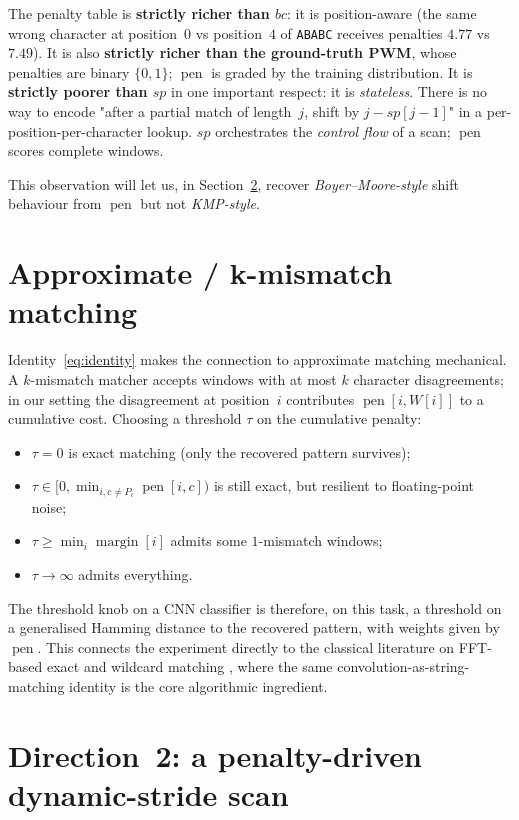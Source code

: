 \documentclass[11pt,a4paper]{article}
\newcommand{\pen}{\operatorname{pen}}
\begin{document}
The penalty table is \textbf{strictly richer than $bc$}: it is
position-aware (the same wrong character at position~$0$ vs position~$4$
of \texttt{ABABC} receives penalties $4.77$ vs $7.49$). It is also
\textbf{strictly richer than the ground-truth PWM}, whose penalties are
binary $\{0,1\}$; $\pen$ is graded by the training distribution.
It is \textbf{strictly poorer than $sp$} in one important respect: it
is \emph{stateless}. There is no way to encode "after a partial match
of length~$j$, shift by $j - sp[j-1]$" in a per-position-per-character
lookup. $sp$ orchestrates the \emph{control flow} of a scan; $\pen$
scores complete windows.

This observation will let us, in Section~\ref{sec:d2}, recover
\emph{Boyer--Moore-style} shift behaviour from $\pen$ but not
\emph{KMP-style}.

\section{Approximate / k-mismatch matching}
\label{sec:approx}

Identity~\eqref{eq:identity} makes the connection to approximate matching
mechanical. A $k$-mismatch matcher accepts windows with at most $k$
character disagreements; in our setting the disagreement at position~$i$
contributes $\pen[i, W[i]]$ to a cumulative cost. Choosing a threshold
$\tau$ on the cumulative penalty:
\begin{itemize}
\item $\tau = 0$ is exact matching (only the recovered pattern survives);
\item $\tau \in [0, \min_{i, c \neq P_i} \pen[i, c])$ is still exact, but
  resilient to floating-point noise;
\item $\tau \ge \min_i \operatorname{margin}[i]$ admits some $1$-mismatch
  windows;
\item $\tau \to \infty$ admits everything.
\end{itemize}
The threshold knob on a CNN classifier is therefore, on this task, a
threshold on a generalised Hamming distance to the recovered pattern,
with weights given by~$\pen$. This connects the experiment directly to
the classical literature on FFT-based exact and wildcard matching
\cite{CliffordClifford2007}, where the same convolution-as-string-matching
identity is the core algorithmic ingredient.

\section{Direction~2: a penalty-driven dynamic-stride scan}
\label{sec:d2}
\end{document}
